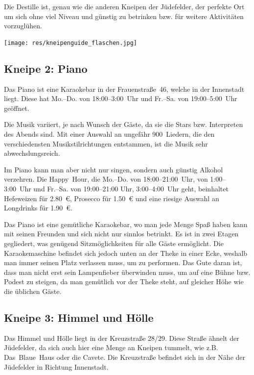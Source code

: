 \begin{multicols*}{2}
Die Destille ist, genau wie die anderen Kneipen der Jüdefelder, der perfekte Ort um sich ohne viel Niveau und günstig zu betrinken bzw. für weitere Aktivitäten vorzuglühen.


\begin{center}
\end{center}

\texttt{[image: res/kneipenguide\_flaschen.jpg]}

\subsection*{Kneipe 2: Piano}
Das Piano ist eine Karaokebar in der Frauenstraße~46, welche in der Innenstadt liegt. Diese hat Mo.--Do. von 18:00--3:00~Uhr und Fr.--Sa. von 19:00--5:00~Uhr geöffnet.

Die Musik variiert, je nach Wunsch der Gäste, da sie die Stars bzw. Interpreten des Abends sind. Mit einer Auswahl an ungefähr 900~Liedern, die den verschiedensten Musikstilrichtungen entstammen, ist die Musik sehr abwechslungsreich.

Im Piano kann man aber nicht nur singen, sondern auch günstig Alkohol verzehren. Die Happy~Hour, die Mo.--Do. von 18:00--21:00~Uhr, von 1:00--3:00~Uhr und Fr.--Sa. von 19:00--21:00 Uhr, 3:00--4:00~Uhr geht, beinhaltet Hefeweizen für \SI{2,80}{\euro}, Prosecco für \SI{1,50}{\euro} und eine riesige Auswahl an Longdrinks für \SI{1,90}{\euro}.

Das Piano ist eine gemütliche Karaokebar, wo man jede Menge Spaß haben kann mit seinen Freunden und sich nicht nur sinnlos betrinkt. Es ist in zwei Etagen gegliedert, was genügend Sitzmöglichkeiten für alle Gäste ermöglicht. Die Karaokemaschine befindet sich jedoch unten an der Theke in einer Ecke, weshalb man immer seinen Platz verlassen muss, um zu performen. Das Gute daran ist, dass man nicht erst sein Lampenfieber überwinden muss, um auf eine Bühne bzw. Podest zu steigen, da man gemütlich vor der Theke steht, auf gleicher Höhe wie die üblichen Gäste.

\begin{center}
\end{center}

\subsection*{Kneipe 3: Himmel und Hölle}
Das Himmel und Hölle liegt in der Kreuzstraße 28/29. Diese Straße ähnelt der Jüdefelder, da sich auch hier eine Menge an Kneipen tummelt, wie z.B. Das~Blaue~Haus oder die Cavete. Die Kreuzstraße befindet sich in der Nähe der Jüdefelder in Richtung Innenstadt.


\end{multicols*}

